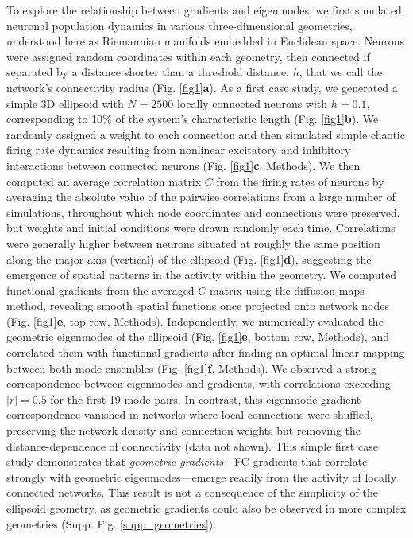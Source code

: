 \documentclass{article}
\begin{document}
To explore the relationship between gradients and eigenmodes, we first simulated neuronal population dynamics in various three-dimensional geometries, understood here as Riemannian manifolds embedded in Euclidean space. Neurons were assigned random coordinates within each geometry, then connected if separated by a distance shorter than a threshold distance, $h$, that we call the network's connectivity radius (Fig. \ref{fig1}\textbf{a}). As a first case study, we generated a simple 3D ellipsoid with $N=2500$ locally connected neurons with $h=0.1$, corresponding to 10\% of the system’s characteristic length (Fig. \ref{fig1}\textbf{b}). We randomly assigned a weight to each connection and then simulated simple chaotic firing rate dynamics resulting from nonlinear excitatory and inhibitory interactions between connected neurons (Fig. \ref{fig1}\textbf{c}, Methods). We then computed an average correlation matrix $C$ from the firing rates of neurons by averaging the absolute value of the pairwise correlations from a large number of simulations, throughout which node coordinates and connections were preserved, but weights and initial conditions were drawn randomly each time. Correlations were generally higher between neurons situated at roughly the same position along the major axis (vertical) of the ellipsoid (Fig. \ref{fig1}\textbf{d}), suggesting the emergence of spatial patterns in the activity within the geometry. We computed functional gradients from the averaged $C$ matrix using the diffusion maps method\cite{Coifman2006}, revealing smooth spatial functions once projected onto network nodes (Fig. \ref{fig1}\textbf{e}, top row, Methods). Independently, we numerically evaluated the geometric eigenmodes of the ellipsoid (Fig. \ref{fig1}\textbf{e}, bottom row, Methods), and correlated them with functional gradients after finding an optimal linear mapping between both mode ensembles (Fig. \ref{fig1}\textbf{f}, Methods). We observed a strong correspondence between eigenmodes and gradients, with correlations exceeding $|r|=0.5$ for the first 19 mode pairs. In contrast, this eigenmode-gradient correspondence vanished in networks where local connections were shuffled, preserving the network density and connection weights but removing the distance-dependence of connectivity (data not shown). This simple first case study demonstrates that \emph{geometric gradients}---FC gradients that correlate strongly with geometric eigenmodes---emerge readily from the activity of locally connected networks. This result is not a consequence of the simplicity of the ellipsoid geometry, as geometric gradients could also be observed in more complex geometries (Supp. Fig. \ref{supp_geometries}). 
\end{document}
